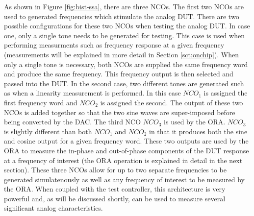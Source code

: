 \documentclass[12pt]{report}
\begin{document}
As shown in Figure \ref{fig:bist-ssa}, there are three NCOs.  The first two NCOs are used to generated frequencies which stimulate the analog DUT.  There are two possible configurations for these two NCOs when testing the analog DUT.  In case one, only a single tone needs to be generated for testing.  This case is used when performing measurments such as frequency response at a given frequency (measurements will be explained in more detail in Section \ref{sct:onchip}\cite{jie-journal}).  When only a single tone is necessary, both NCOs are supplied the same frequency word and produce the same frequency\cite{jie}.  This frequency output is then selected and passed into the DUT.  In the second case, two different tones are generated such as when a linearity measurement is performed.  In this case $NCO_1$ is assigned the first frequency word and $NCO_2$ is assigned the second.  The output of these two NCOs is added together so that the two sine waves are super-imposed before being converted by the DAC\cite{jie}.  The third NCO $NCO_3$ is used by the ORA.  $NCO_3$ is slightly different than both $NCO_1$ and $NCO_2$ in that it produces both the sine and cosine output for a given frequency word.  These two outputs are used by the ORA to measure the in-phase and out-of-phase components of the DUT response at a frequency of interest (the ORA operation is explained in detail in the next section)\cite{jie}.   These three NCOs allow for up to two separate frequencies to be generated simulatenously as well as any frequency of interest to be measured by the ORA.  When coupled with the test controller, this architecture is very powerful and, as will be discussed shortly, can be used to measure several significant analog characteristics.
\end{document}
